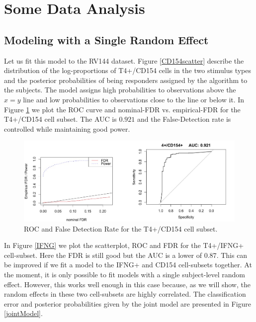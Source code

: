 \documentclass{article}\usepackage[]{graphicx}\usepackage[]{color}
\makeatletter
\def\maxwidth{ %
  \ifdim\Gin@nat@width>\linewidth
    \linewidth
  \else
    \Gin@nat@width
  \fi
}
\makeatother
\begin{document}
\section{Some Data Analysis}
\subsection{Modeling with a Single Random Effect}
Let us fit this model to the RV144 dataset. Figure \ref{CD154scatter} describe the distribution of the log-proportions of T4+/CD154 cells in the two stimulus types and the posterior probabilities of being responders assigned by the algorithm to the subjects. The model assigns high probabilities to observations above the $x=y$ line and low probabilities to observations close to the line or below it. In Figure \ref{CD154roc} we plot the ROC curve and nominal-FDR vs. empirical-FDR for the T4+/CD154 cell subset. The AUC is $0.921$ and the False-Detection rate is controlled while maintaining good power. 

\begin{figure}
\includegraphics[width=\maxwidth]{figures/T4CD154roc} \caption[]{ROC and False Detection Rate for the T4+/CD154 cell subset.}
\label{CD154roc}
\end{figure}

In Figure \ref{IFNG} we plot the scatterplot, ROC and FDR for the T4+/IFNG+ cell-subset. Here the FDR is still good but the AUC is a lower of $0.87$. This can be improved if we fit a model to the IFNG+ and  CD154 cell-subsets together. At the moment, it is only possible to fit models with a single subject-level random effect.  However, this works well enough in this case because, as we will show, the random effects in these two cell-subsets are highly correlated. The classification error and posterior probabilities given by the joint model are presented in Figure \ref{jointModel}.
\end{document}
